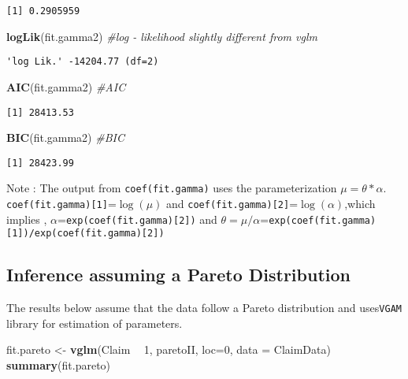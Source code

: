 \documentclass[]{book}
\newenvironment{Shaded}{\begin{snugshade}}{\end{snugshade}}
\newcommand{\KeywordTok}[1]{\textcolor[rgb]{0.13,0.29,0.53}{\textbf{#1}}}
\newcommand{\DataTypeTok}[1]{\textcolor[rgb]{0.13,0.29,0.53}{#1}}
\newcommand{\DecValTok}[1]{\textcolor[rgb]{0.00,0.00,0.81}{#1}}
\newcommand{\StringTok}[1]{\textcolor[rgb]{0.31,0.60,0.02}{#1}}
\newcommand{\CommentTok}[1]{\textcolor[rgb]{0.56,0.35,0.01}{\textit{#1}}}
\newcommand{\OperatorTok}[1]{\textcolor[rgb]{0.81,0.36,0.00}{\textbf{#1}}}
\newcommand{\NormalTok}[1]{#1}
\theoremstyle{definition}
\theoremstyle{definition}
\theoremstyle{definition}
\theoremstyle{remark}
\begin{document}
\begin{verbatim}
[1] 0.2905959
\end{verbatim}

\begin{Shaded}
\begin{Highlighting}[]
\KeywordTok{logLik}\NormalTok{(fit.gamma2)  }\CommentTok{#log - likelihood slightly different from vglm}
\end{Highlighting}
\end{Shaded}

\begin{verbatim}
'log Lik.' -14204.77 (df=2)
\end{verbatim}

\begin{Shaded}
\begin{Highlighting}[]
\KeywordTok{AIC}\NormalTok{(fit.gamma2)     }\CommentTok{#AIC}
\end{Highlighting}
\end{Shaded}

\begin{verbatim}
[1] 28413.53
\end{verbatim}

\begin{Shaded}
\begin{Highlighting}[]
\KeywordTok{BIC}\NormalTok{(fit.gamma2)     }\CommentTok{#BIC}
\end{Highlighting}
\end{Shaded}

\begin{verbatim}
[1] 28423.99
\end{verbatim}

Note : The output from \texttt{coef(fit.gamma)} uses the
parameterization \(\mu=\theta * \alpha\).
\texttt{coef(fit.gamma){[}1{]}}=\(\log(\mu)\) and
\texttt{coef(fit.gamma){[}2{]}}=\(\log(\alpha)\),which implies ,
\(\alpha\)=\texttt{exp(coef(fit.gamma){[}2{]})} and
\(\theta=\mu/\alpha\)=\texttt{exp(coef(fit.gamma){[}1{]})/exp(coef(fit.gamma){[}2{]})}

\subsection{Inference assuming a Pareto
Distribution}\label{inference-assuming-a-pareto-distribution}

The results below assume that the data follow a Pareto distribution and
uses\texttt{VGAM} library for estimation of parameters.

\begin{Shaded}
\begin{Highlighting}[]
\NormalTok{fit.pareto <-}\StringTok{ }\KeywordTok{vglm}\NormalTok{(Claim }\OperatorTok{~}\StringTok{ }\DecValTok{1}\NormalTok{, paretoII, }\DataTypeTok{loc=}\DecValTok{0}\NormalTok{, }\DataTypeTok{data =}\NormalTok{ ClaimData)}
\KeywordTok{summary}\NormalTok{(fit.pareto)}
\end{Highlighting}
\end{Shaded}
\end{document}

